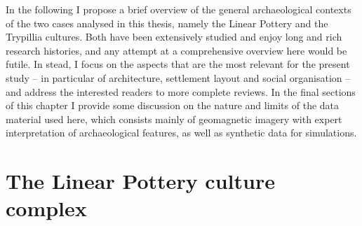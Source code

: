 \documentclass[
  12pt,
  a4paper, twoside]{book}
\begin{document}
In the following I propose a brief overview of the general archaeological contexts of the two cases analysed in this thesis, namely the Linear Pottery and the Trypillia cultures. Both have been extensively studied and enjoy long and rich research histories, and any attempt at a comprehensive overview here would be futile. In stead, I focus on the aspects that are the most relevant for the present study -- in particular of architecture, settlement layout and social organisation -- and address the interested readers to more complete reviews. In the final sections of this chapter I provide some discussion on the nature and limits of the data material used here, which consists mainly of geomagnetic imagery with expert interpretation of archaeological features, as well as synthetic data for simulations.

\hypertarget{lbk}{%
\section{The Linear Pottery culture complex}\label{lbk}}
\end{document}
